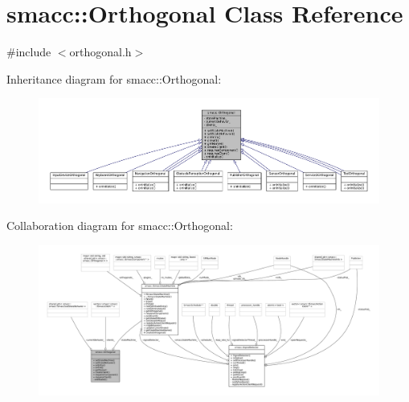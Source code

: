 \hypertarget{classsmacc_1_1Orthogonal}{}\section{smacc\+:\+:Orthogonal Class Reference}
\label{classsmacc_1_1Orthogonal}


{\ttfamily \#include $<$orthogonal.\+h$>$}



Inheritance diagram for smacc\+:\+:Orthogonal\+:
\nopagebreak
\begin{figure}[H]
\begin{center}
\leavevmode
\includegraphics[width=350pt]{classsmacc_1_1Orthogonal__inherit__graph}
\end{center}
\end{figure}


Collaboration diagram for smacc\+:\+:Orthogonal\+:
\nopagebreak
\begin{figure}[H]
\begin{center}
\leavevmode
\includegraphics[width=350pt]{classsmacc_1_1Orthogonal__coll__graph}
\end{center}
\end{figure}
